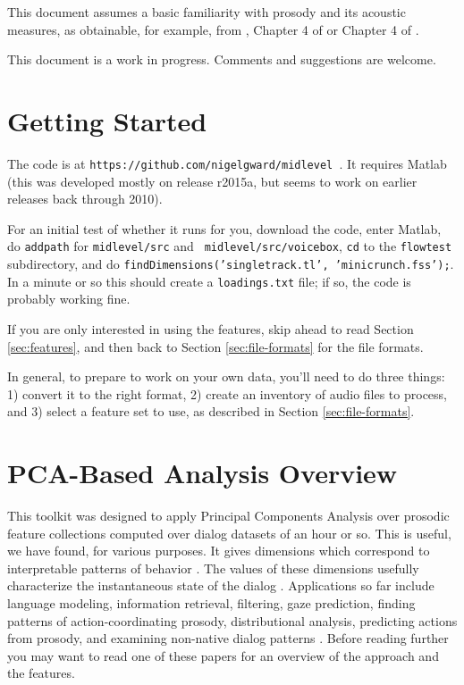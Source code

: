 \documentclass[11pt]{article}
\begin{document}
This document assumes a basic familiarity with prosody and its
acoustic measures, as obtainable, for example, from \cite{me-cup},
Chapter 4 of \cite{ogden-phonetics} or Chapter 4 of
\cite{ladefoged03}.

This document is a work in progress.  Comments and suggestions are
welcome.


\section{Getting Started}

The code is at {\tt https://github.com/nigelgward/midlevel }.  It requires
 Matlab (this was developed mostly on release r2015a, but seems to
 work on earlier releases back through 2010).


For an initial test of whether it runs for you, download the code,
enter Matlab, do {\tt addpath} for {\tt midlevel/src} and {\tt
  midlevel/src/voicebox}, {\tt cd} to the {\tt flowtest} subdirectory,
and do {\tt findDimensions('singletrack.tl', 'minicrunch.fss');}. In a
minute or so this should create a {\tt loadings.txt} file; if so, the
code is probably working fine.

If you are only interested in using the features, skip ahead to read
Section \ref{sec:features}, and then back to Section
\ref{sec:file-formats} for the file formats.

In general, to prepare to work on your own data, you'll need to do
three things: 1) convert it to the right format, 2) create an
inventory of audio files to process, and 3) select a feature set to
use, as described in Section \ref{sec:file-formats}.


\section{PCA-Based Analysis Overview }

This toolkit was designed to apply Principal Components Analysis over
prosodic feature collections computed over dialog datasets of an hour
or so.  This is useful, we have found, for various purposes.  It gives
dimensions which correspond to interpretable patterns of behavior
\cite{prosodic-elements}.  The values of these dimensions usefully
characterize the instantaneous state of the dialog
\cite{dialog-dimensions}.  Applications so far include language
modeling, information retrieval, filtering, gaze prediction, finding
patterns of action-coordinating prosody, distributional analysis,
predicting actions from prosody, and examining non-native dialog
patterns
\cite{pca-lm,prosody-ir,sigdial-codec,ward-gaze,ward-abu,dimensions-uh-huh,l2english,me-mandarin,ward-stance}.
Before reading further you may want to read one of these papers for an
overview of the approach and the features.
\end{document}
